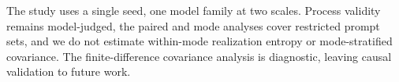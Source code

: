 \documentclass[letterpaper]{article} %
\begin{document}
The study uses a single seed, one model family at two scales. Process validity remains model-judged, the paired and mode analyses cover restricted prompt sets, and we do not estimate within-mode realization entropy or mode-stratified covariance. The finite-difference covariance analysis is diagnostic, leaving causal validation to future work.



% 
\end{document}
